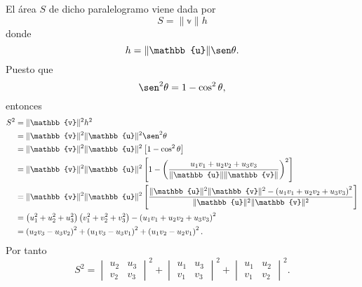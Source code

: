 El área $S$ de dicho paralelogramo viene dada por
$$S = \| \mathbb{v} \| h$$
donde
$$h = \| \mathbb{u} \| \sen \theta.$$
Puesto que
$$\sen ^2 \theta = 1-\cos ^2 \theta,$$
entonces
$$
\begin{aligned}
    S^2 & = \| \mathbb{v} \|^2 h^2 \\
    & = \| \mathbb{v} \|^2 \| \mathbb{u} \|^2 \sen^2 \theta \\
    & = \| \mathbb{v} \|^2 \| \mathbb{u} \|^2 \left[1-\cos ^2 \theta\right] \\
    & = \| \mathbb{v} \|^2 \| \mathbb{u} \|^2 \left[1-\left(\frac{u_1 v_1+u_2 v_2+u_3 v_3}{\| \mathbb{u} \| \| \mathbb{v} \|}\right)^2\right] \\
    & = \| \mathbb{v} \|^2 \| \mathbb{u} \|^2\left[\frac{\| \mathbb{u} \|^2 \| \mathbb{v} \|^2-\left(u_1 v_1+u_2 v_2+u_3 v_3\right)^2}{\| \mathbb{u} \|^2 \| \mathbb{v} \|^2}\right] \\
    & =\left(u_1^2+u_2^2+u_3^2\right)\left(v_1^2+v_2^2+v_3^2\right)-\left(u_1 v_1+u_2 v_2+u_3 v_3\right)^2 \\
    & =\left(u_2 v_3-u_3 v_2\right)^2+\left(u_1 v_3-u_3 v_1\right)^2+\left(u_1 v_2-u_2 v_1\right)^2 .
\end{aligned}
$$
Por tanto
$$
S^2=\begin{vmatrix}
    u_2 & u_3 \\
    v_2 & v_3
\end{vmatrix}^2+\begin{vmatrix}
    u_1 & u_3 \\
    v_1 & v_3
\end{vmatrix}^2+\begin{vmatrix}
    u_1 & u_2 \\
    v_1 & v_2
\end{vmatrix}^2.
$$

